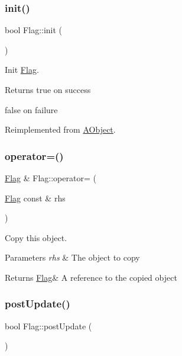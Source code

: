 \subsubsection{\texorpdfstring{init()}{init()}}
{\footnotesize\ttfamily bool Flag\+::init (\begin{DoxyParamCaption}{ }\end{DoxyParamCaption})\hspace{0.3cm}{\ttfamily [virtual]}}



Init \hyperlink{class_flag}{Flag}. 

\begin{DoxyReturn}{Returns}
true on success 

false on failure 
\end{DoxyReturn}


Reimplemented from \hyperlink{class_a_object_afa83ef1c900a47453524219788327b86}{A\+Object}.

\mbox{\label{class_flag_a6834049fb149bb14e35a4f273937c419}} 
\subsubsection{\texorpdfstring{operator=()}{operator=()}}
{\footnotesize\ttfamily \hyperlink{class_flag}{Flag} \& Flag\+::operator= (\begin{DoxyParamCaption}\item[{\hyperlink{class_flag}{Flag} const \&}]{rhs }\end{DoxyParamCaption})}



Copy this object. 


\begin{DoxyParams}{Parameters}
{\em rhs} & The object to copy \\
\hline
\end{DoxyParams}
\begin{DoxyReturn}{Returns}
\hyperlink{class_flag}{Flag}\& A reference to the copied object 
\end{DoxyReturn}
\mbox{\label{class_flag_a1840a0949762e3e62bf156be6e173d1e}} 
\subsubsection{\texorpdfstring{post\+Update()}{postUpdate()}}
{\footnotesize\ttfamily bool Flag\+::post\+Update (\begin{DoxyParamCaption}{ }\end{DoxyParamCaption})\hspace{0.3cm}{\ttfamily [virtual]}}



